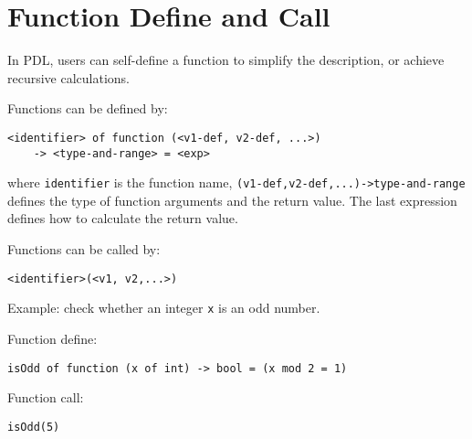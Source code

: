 \documentclass{report}
\begin{document}
\section{Function Define and Call}

In PDL, users can self-define a function to simplify the description, or achieve recursive calculations.

Functions can be defined by:
\begin{lstlisting}
<identifier> of function (<v1-def, v2-def, ...>)
    -> <type-and-range> = <exp>
\end{lstlisting}
where \texttt{identifier} is the function name, \texttt{(v1-def,v2-def,...)->type-and-range} defines the type of function arguments and the return value. The last expression defines how to calculate the return value.

Functions can be called by:
\begin{lstlisting}
<identifier>(<v1, v2,...>)
\end{lstlisting}

Example: check whether an integer \texttt{x} is an odd number.

Function define:
\begin{lstlisting}
isOdd of function (x of int) -> bool = (x mod 2 = 1)
\end{lstlisting}

Function call:
\begin{lstlisting}
isOdd(5)
\end{lstlisting}

%
%
\end{document}
